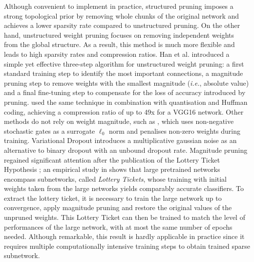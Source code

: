 Although convenient to implement in practice, structured pruning imposes a
strong topological prior by removing whole chunks of the original network and
achieves a lower sparsity rate compared to unstructured pruning. On the other
hand, unstructured weight pruning focuses on removing independent weights from
the global structure. As a result, this method is much more flexible and leads
to high sparsity rates and compression ratios. Han et al.
\cite{DBLP:conf/nips/HanPTD15} introduced a simple yet effective three-step
algorithm for unstructured weight pruning: a first standard training step to
identify the most important connections, a magnitude pruning step to remove
weights with the smallest magnitude (\emph{i.e.}, absolute value) and a final
fine-tuning step to compensate for the loss of accuracy introduced by pruning.
\cite{DBLP:journals/corr/HanMD15} used the same technique in combination with
quantisation and Huffman coding, achieving a compression ratio of up to 49x for
a VGG16 network. Other methods do not rely on weight magnitude, such as
\cite{DBLP:conf/iclr/LouizosWK18}, which uses non-negative stochastic gates as a
surrogate $\ell_0$ norm and penalises non-zero weights during training. Variational
Dropout \cite{DBLP:conf/icml/MolchanovAV17} introduces a multiplicative gaussian
noise as an alternative to binary dropout
\cite{DBLP:journals/corr/abs-1207-0580,DBLP:journals/jmlr/SrivastavaHKSS14} with
an unbound dropout rate. Magnitude pruning regained significant attention after
the publication of the Lottery Ticket Hypothesis
\cite{DBLP:conf/iclr/FrankleC19}; an empirical study in
\cite{DBLP:conf/iclr/FrankleC19} shows that large pretrained networks encompass
subnetworks, called \textit{Lottery Tickets}, whose training with initial
weights taken from the large networks yields comparably accurate classifiers. To
extract the lottery ticket, it is necessary to train the large network up to
convergence, apply magnitude pruning and restore the original values of the
unpruned weights. This Lottery Ticket can then be trained to match the level of
performances of the large network, with at most the same number of epochs
needed. Although remarkable, this result is hardly applicable in practice since
it requires multiple computationally intensive training steps to obtain trained
sparse subnetwork.\\


